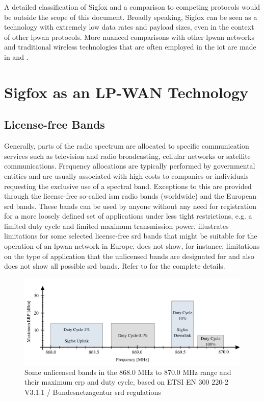 A detailed classification of Sigfox and a comparison to competing protocols would be outside the scope of this document.
Broadly speaking, Sigfox can be seen as a technology with extremely low data rates and payload sizes, even in the context of other \gls{lpwan} protocols.
More nuanced comparisons with other \gls{lpwan} networks and traditional wireless technologies that are often employed in the \gls{iot} are made in \cite{lpwan_comparison} and \cite{iot_protocol_overview}.

\FloatBarrier
\section{Sigfox as an LP-WAN Technology}
\subsection{License-free Bands}
Generally, parts of the radio spectrum are allocated to specific communication services such as television and radio broadcasting, cellular networks or satellite communications.
Frequency allocations are typically performed by governmental entities and are usually associated with high costs to companies or individuals requesting the exclusive use of a spectral band.
Exceptions to this are provided through the license-free so-called \gls{ism} radio bands (worldwide) and the European \gls{srd} bands.
These bands can be used by anyone without any need for registration for a more loosely defined set of applications under less tight restrictions, e.g. a limited duty cycle and limited maximum transmission power.
 illustrates limitations for some selected license-free \gls{srd} bands that might be suitable for the operation of an \gls{lpwan} network in Europe.
 does not show, for instance, limitations on the type of application that the unlicensed bands are designated for and also does not show all possible \gls{srd} bands.
Refer to \cite{bnetza_srd} for the complete details.

\begin{figure}[h]
	\centering
	\includegraphics[width=1.0\textwidth]{fig/srd_bands.pdf}
	\caption{Some unlicensed bands in the 868.0 MHz to 870.0 MHz range and their maximum \gls{erp} and duty cycle, based on ETSI EN 300 220-2 V3.1.1 / Bundesnetzagentur \gls{srd} regulations \cite{bnetza_srd}}
	\label{fig:srd_bands}
\end{figure}

